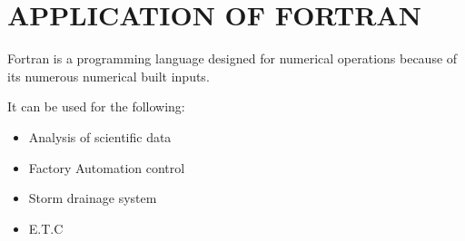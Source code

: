 \documentclass{article}
\begin{document}
	\section*{APPLICATION OF FORTRAN}
	Fortran is a programming language designed for numerical operations because of its numerous numerical built inputs.
	
	It can be used for the following:
	\begin{itemize}
		\item Analysis of scientific data
		\item Factory Automation control
		\item Storm drainage system
		\item E.T.C
	\end{itemize}
\end{document}
